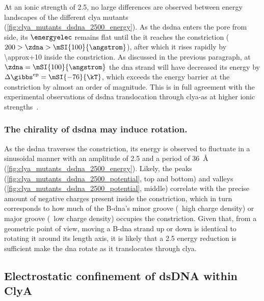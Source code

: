 At an ionic strength of \SI{2.5}{\Molar}, no large differences are observed between energy landscapes of the
different \gls{clya} mutants (\cref{fig:clya_mutants_dsdna_2500_energy}). As the \gls{dsdna} enters the pore
from \cisi{} side, its $\energyelec$ remains flat until the it reaches the constriction ($200 > \zdna >
\mSI{100}{\angstrom}$), after which it rises rapidly by \SI{\approx+10}{\kT} inside the constriction. As
discussed in the previous paragraph, at $\zdna = \mSI{100}{\angstrom}$ the \gls{dna} strand will have
decreased its energy by $\Delta \gibbs^{\textrm{ep}} = \mSI{-76}{\kT}$, which exceeds the energy barrier at
the constriction by almost an order of magnitude. This is in full agreement with the experimental observations
of \gls{dsdna} translocation through \gls{clya-as} at higher ionic
strengths~\cite{Franceschini-2013,Franceschini-2016}.

\subsubsection{The chirality of \gls{dsdna} may induce rotation.}
%

As the \gls{dsdna} traverses the constriction, its energy is observed to fluctuate in a sinusoidal manner with
an amplitude of \SI{2.5}{\kT} and a period of \SI{36}{\angstrom} (\cref{fig:clya_mutants_dsdna_2500_energy}).
Likely, the peaks (\cref{fig:clya_mutants_dsdna_2500_potential}, top and bottom) and valleys
(\cref{fig:clya_mutants_dsdna_2500_potential}, middle) correlate with the precise amount of negative charges
present inside the constriction, which in turn corresponds to how much of the B-\gls{dna}'s minor groove
(\ie~high charge density) or major groove (\ie~low charge density) occupies the constriction. Given that, from
a geometric point of view, moving a B-\gls{dna} strand up or down is identical to rotating it around its
length axis, it is likely that a \SI{2.5}{\kT} energy reduction is sufficient make the \gls{dna} rotate as it
translocates through \gls{clya}.


\subsection{Electrostatic confinement of {dsDNA} within {ClyA}}
%


